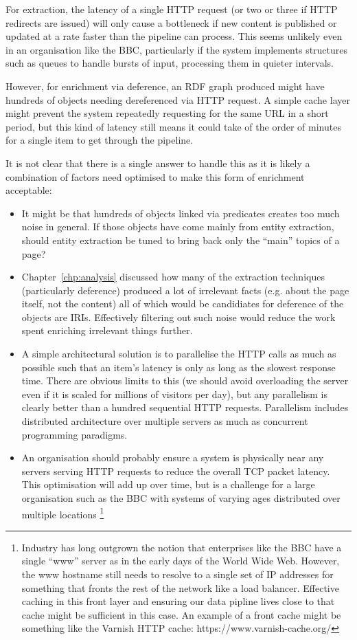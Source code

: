 For extraction, the latency of a single HTTP request (or two or three
if HTTP redirects are issued) will only cause a bottleneck if new
content is published or updated at a rate faster than the pipeline
can process. This seems unlikely even in an organisation like the BBC,
particularly if the system implements structures such as queues to
handle bursts of input, processing them in quieter intervals.

However, for enrichment via deference, an RDF graph produced might
have hundreds of objects needing dereferenced via HTTP request. A
simple cache layer might prevent the system repeatedly requesting for
the same URL in a short period, but this kind of latency still means
it could take of the order of minutes for a single item to get
through the pipeline.

It is not clear that there is a single answer to handle this as it is
likely a combination of factors need optimised to make this form
of enrichment acceptable:

\begin{itemize}
\item It might be that hundreds of objects linked via predicates
  creates too much noise in general. If those objects have come mainly
  from entity extraction, should entity extraction be tuned to bring
  back only the ``main'' topics of a page?
\item Chapter~\ref{chp:analysis} discussed how many of the extraction
  techniques (particularly deference) produced a lot of irrelevant
  facts (e.g. about the page itself, not the content) all of which
  would be candidiates for deference of the objects are IRIs.
  Effectively filtering out such noise would reduce the work spent
  enriching irrelevant things further.
\item A simple architectural solution is to parallelise the HTTP
  calls as much as possible such that an item's latency is only as
  long as the slowest response time. There are obvious limits to this
  (we should avoid overloading the server even if it is scaled for
  millions of visitors per day), but any parallelism is clearly
  better than a hundred sequential HTTP requests. Parallelism includes
  distributed architecture over multiple servers as much as
  concurrent programming paradigms.
\item An organisation should probably ensure a system is physically
  near any servers serving HTTP requests to reduce the overall TCP
  packet latency. This optimisation will add up over time, but is
  a challenge for a large organisation such as the BBC with systems
  of varying ages distributed over multiple locations
  \footnote{Industry has
  long outgrown the notion
  that enterprises like the BBC have a single ``www'' server as
  in the early days of the World Wide Web. However, the www hostname
  still needs to resolve to a single set of IP addresses for something
  that fronts the rest of the network like a load balancer. Effective
  caching in this front layer and ensuring our data pipline lives close
  to that cache might be sufficient in this case. An example of a
  front cache might be something like the Varnish HTTP cache:
  https://www.varnish-cache.org/}
\end{itemize}

